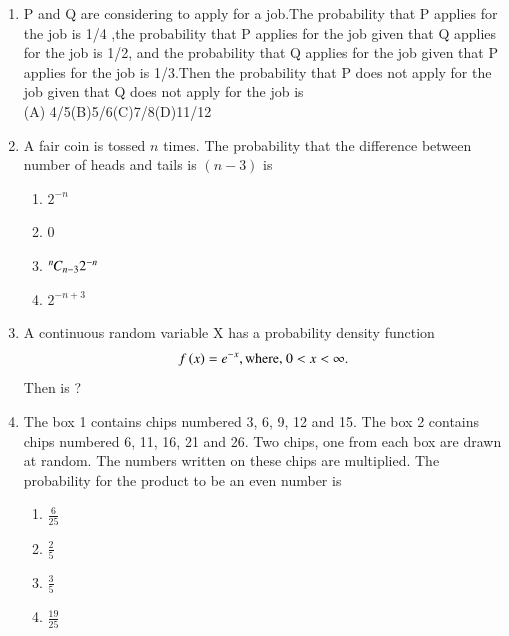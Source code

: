 \documentclass[journal,12pt,twocolumn]{IEEEtran}
\begin{document}
\begin{enumerate}
\begin{align}
\end{align}
Find $\pr{X \leq 1}$\\
(A) \(1 - Q(0.5)\) \hspace{1cm}
(B) \(Q(0.5)\) \\
(C) \(Q(\frac{1}{2\sqrt{2}})\) \hspace{1.6cm}
(D) \(1 - Q(\frac{1}{2\sqrt{2}})\)\\
\solution

%
\item P and Q are considering to apply for a job.The probability that P applies for the job is 1/4 ,the probability that P applies for the job given that Q applies for the job is 1/2, and the probability that Q applies for the job given that P applies for the job is 1/3.Then the probability that P does not apply for the job given that Q does not apply for the job is\\ 
(A) 4/5\quad\quad(B)5/6\quad\quad(C)7/8\quad\quad(D)11/12
\\
\solution

%
\item A fair coin is tossed $n$ times. The probability that the difference between number of heads and tails is $(n-3)$ is 
\begin{enumerate}
    \item $2^{-n}$
    \item 0
    \item ${{}^{n}\mkern-1muC_{n-3}}2^{-n}$
    \item $2^{-n+3}$
\end{enumerate}
\solution

%
\item A continuous random variable X has a probability density function 
\begin{align}
 f\left(x\right) = e^{-x}, \text{where, } 0<x<\infty.
\end{align}
Then  is ?
\solution

%
\item The box 1 contains chips numbered 3, 6, 9, 12 and 15. The box 2 contains chips numbered 6, 11, 16, 21 and 26.
Two chips, one from each box are drawn at random. The numbers written on these chips are multiplied. The probability 
for the product to be an even number is
%
\begin{enumerate}
\item $\frac{6}{25}$
\item $\frac{2}{5}$
\item $\frac{3}{5}$
\item $\frac{19}{25}$
\end{enumerate}

\end{enumerate}
\end{document}
